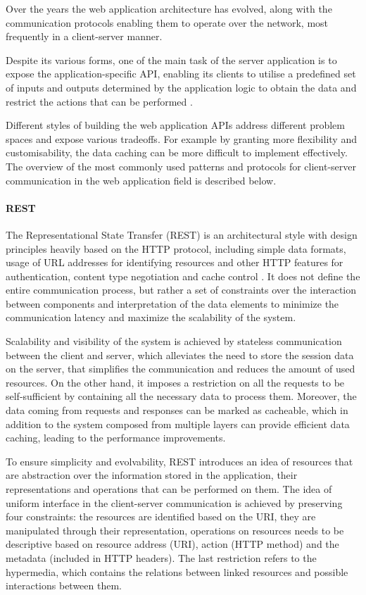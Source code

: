 Over the years the web application architecture has evolved, along with the communication protocols enabling them to operate over the network, most frequently in a client-server manner. 

Despite its various forms, one of the main task of the server application is to expose the application-specific API, enabling its clients to utilise a predefined set of inputs and outputs determined by the application logic to obtain the data and restrict the actions that can be performed \cite{DesignDataIntensiveApplications}.

Different styles of building the web application APIs address different problem spaces and expose various tradeoffs. For example by granting more flexibility and customisability, the data caching can be more difficult to implement effectively.
The overview of the most commonly used patterns and protocols for client-server communication in the web application field is described below.

\paragraph{REST}

The Representational State Transfer (REST) is an architectural style with design principles heavily based on the HTTP protocol, including simple data formats, usage of URL addresses for identifying resources and other HTTP features for authentication, content type negotiation and cache control \cite{RESTPrincipledDesingOfModernWebArchitecture}. It does not define the entire communication process, but rather a set of constraints over the interaction between components and interpretation of the data elements to minimize the communication latency and maximize the scalability of the system.

Scalability and visibility of the system is achieved by stateless communication between the client and server, which alleviates the need to store the session data on the server, that simplifies the communication and reduces the amount of used resources. On the other hand, it imposes a restriction on all the requests to be self-sufficient by containing all the necessary data to process them. Moreover, the data coming from requests and responses can be marked as cacheable, which in addition to the system composed from multiple layers can provide efficient data caching, leading to the performance improvements.

To ensure simplicity and evolvability, REST introduces an idea of resources that are abstraction over the information stored in the application, their representations and operations that can be performed on them.
The idea of uniform interface in the client-server communication is achieved by preserving four constraints: the resources are identified based on the URI, they are manipulated through their representation, operations on resources needs to be descriptive based on resource address (URI), action (HTTP method) and the metadata (included in HTTP headers). The last restriction refers to the hypermedia, which contains the relations between linked resources and possible interactions between them.

